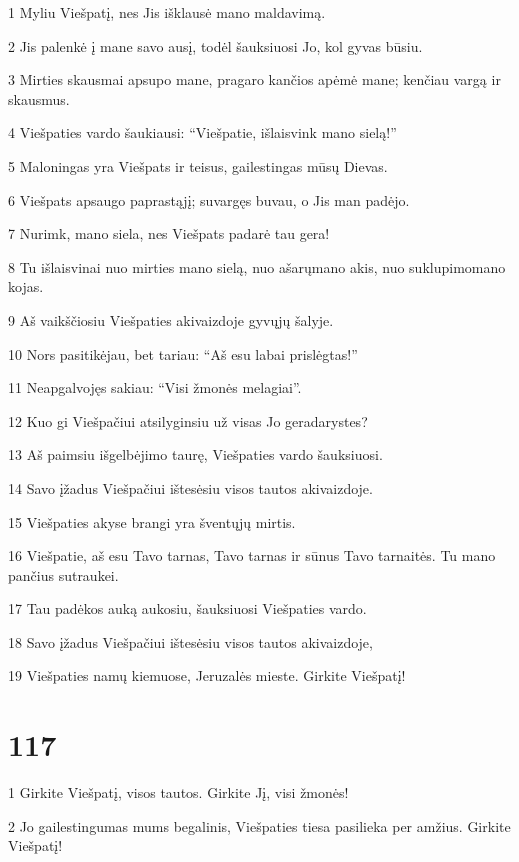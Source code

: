 \par 1 Myliu Viešpatį, nes Jis išklausė mano maldavimą. 
\par 2 Jis palenkė į mane savo ausį, todėl šauksiuosi Jo, kol gyvas būsiu. 
\par 3 Mirties skausmai apsupo mane, pragaro kančios apėmė mane; kenčiau vargą ir skausmus. 
\par 4 Viešpaties vardo šaukiausi: “Viešpatie, išlaisvink mano sielą!” 
\par 5 Maloningas yra Viešpats ir teisus, gailestingas mūsų Dievas. 
\par 6 Viešpats apsaugo paprastąjį; suvargęs buvau, o Jis man padėjo. 
\par 7 Nurimk, mano siela, nes Viešpats padarė tau gera! 
\par 8 Tu išlaisvinai nuo mirties mano sielą, nuo ašarų­mano akis, nuo suklupimo­mano kojas. 
\par 9 Aš vaikščiosiu Viešpaties akivaizdoje gyvųjų šalyje. 
\par 10 Nors pasitikėjau, bet tariau: “Aš esu labai prislėgtas!” 
\par 11 Neapgalvojęs sakiau: “Visi žmonės melagiai”. 
\par 12 Kuo gi Viešpačiui atsilyginsiu už visas Jo geradarystes? 
\par 13 Aš paimsiu išgelbėjimo taurę, Viešpaties vardo šauksiuosi. 
\par 14 Savo įžadus Viešpačiui ištesėsiu visos tautos akivaizdoje. 
\par 15 Viešpaties akyse brangi yra šventųjų mirtis. 
\par 16 Viešpatie, aš esu Tavo tarnas, Tavo tarnas ir sūnus Tavo tarnaitės. Tu mano pančius sutraukei. 
\par 17 Tau padėkos auką aukosiu, šauksiuosi Viešpaties vardo. 
\par 18 Savo įžadus Viešpačiui ištesėsiu visos tautos akivaizdoje, 
\par 19 Viešpaties namų kiemuose, Jeruzalės mieste. Girkite Viešpatį!


\chapter{117}


\par 1 Girkite Viešpatį, visos tautos. Girkite Jį, visi žmonės! 
\par 2 Jo gailestingumas mums begalinis, Viešpaties tiesa pasilieka per amžius. Girkite Viešpatį!


